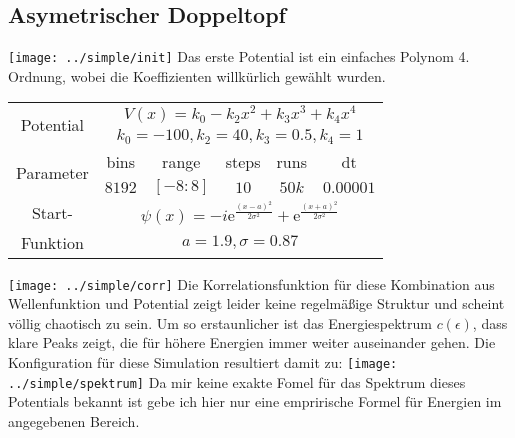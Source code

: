 \documentclass[10pt,a4paper,german]{scrartcl}
\begin{document}
  	\subsection{Asymetrischer Doppeltopf}
			\texttt{[image: ../simple/init]}
  		Das erste Potential ist ein einfaches Polynom 4. Ordnung, wobei die
  		Koeffizienten willkürlich gewählt wurden.
  		\small{\begin{tabular}{|c|c|c|c|c|c|} \hline
				\multirow{2}{*}{Potential}  &
					\multicolumn{5}{|c|}{$V(x)= k_0 - k_2 x^2 + k_3 x^3 + k_4 x^4$} \\
				&
					\multicolumn{5}{|c|}{$k_0 = -100, k_2=40, k_3=0.5, k_4=1$} \\ \hline
				\multirow{2}{*}{Parameter}
				& bins   & range      & steps   & runs  & dt \\
				          & $8192$ & ${[-8:8]}$ & $10$    & $50k$ & $0.00001$ \\ \hline
				Start- &
					\multicolumn{5}{|c|}{
						$
							\psi(x) = -i \mathrm{e}^{\frac{(x-a)^2}{2\sigma^2}}
											+ \mathrm{e}^{\frac{(x+a)^2}{2\sigma^2}}
						$
					} \\
				Funktion & \multicolumn{5}{|c|}{$a = 1.9, \sigma = 0.87$} \\\hline
			\end{tabular}}
			\texttt{[image: ../simple/corr]}
			Die Korrelationsfunktion für diese Kombination aus Wellenfunktion
			und Potential zeigt leider keine regelmäßige Struktur und scheint
			völlig chaotisch zu sein. Um so erstaunlicher ist das Energiespektrum
			$c(\epsilon)$, dass klare Peaks zeigt, die für höhere Energien
			immer weiter auseinander gehen. Die Konfiguration für diese Simulation
			resultiert damit zu:
			\texttt{[image: ../simple/spektrum]}
			Da mir keine exakte Fomel für das Spektrum dieses Potentials bekannt ist
			gebe ich hier nur eine emprirische Formel für Energien im angegebenen Bereich.
			
\end{document}
